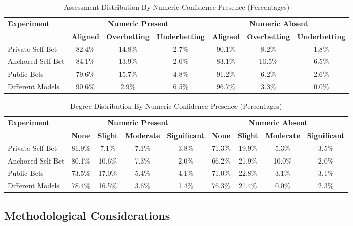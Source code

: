 \documentclass{article}
\begin{document}
\begin{table}[htbp]
\centering
\caption{Assessment Distribution By Numeric Confidence Presence (Percentages)}
\label{tab:assessment_by_numeric}
\begin{tabular}{lcccccc}
\toprule
\textbf{Experiment} & \multicolumn{3}{c}{\textbf{Numeric Present}} & \multicolumn{3}{c}{\textbf{Numeric Absent}} \\
\cmidrule(lr){2-4} \cmidrule(lr){5-7}
& \textbf{Aligned} & \textbf{Overbetting} & \textbf{Underbetting} & \textbf{Aligned} & \textbf{Overbetting} & \textbf{Underbetting} \\
\midrule
Private Self-Bet & 82.4\% & 14.8\% & 2.7\% & 90.1\% & 8.2\% & 1.8\% \\
Anchored Self-Bet & 84.1\% & 13.9\% & 2.0\% & 83.1\% & 10.5\% & 6.5\% \\
Public Bets & 79.6\% & 15.7\% & 4.8\% & 91.2\% & 6.2\% & 2.6\% \\
Different Models & 90.6\% & 2.9\% & 6.5\% & 96.7\% & 3.3\% & 0.0\% \\
\bottomrule
\end{tabular}
\end{table}

\begin{table}[htbp]
\centering
\caption{Degree Distribution By Numeric Confidence Presence (Percentages)}
\label{tab:degree_by_numeric}
\begin{tabular}{lcccccccc}
\toprule
\textbf{Experiment} & \multicolumn{4}{c}{\textbf{Numeric Present}} & \multicolumn{4}{c}{\textbf{Numeric Absent}} \\
\cmidrule(lr){2-5} \cmidrule(lr){6-9}
& \textbf{None} & \textbf{Slight} & \textbf{Moderate} & \textbf{Significant} & \textbf{None} & \textbf{Slight} & \textbf{Moderate} & \textbf{Significant} \\
\midrule
Private Self-Bet & 81.9\% & 7.1\% & 7.1\% & 3.8\% & 71.3\% & 19.9\% & 5.3\% & 3.5\% \\
Anchored Self-Bet & 80.1\% & 10.6\% & 7.3\% & 2.0\% & 66.2\% & 21.9\% & 10.0\% & 2.0\% \\
Public Bets & 73.5\% & 17.0\% & 5.4\% & 4.1\% & 71.0\% & 22.8\% & 3.1\% & 3.1\% \\
Different Models & 78.4\% & 16.5\% & 3.6\% & 1.4\% & 76.3\% & 21.4\% & 0.0\% & 2.3\% \\
\bottomrule
\end{tabular}
\end{table}

\subsection{Methodological Considerations}
\label{appendix:methodological_considerations}
\end{document}
